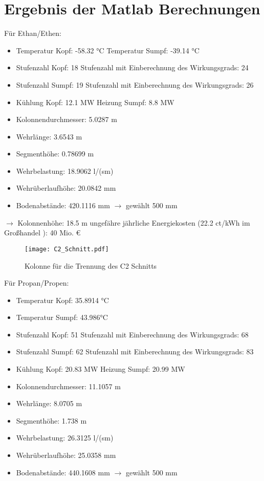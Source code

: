 \documentclass[12pt,a4paper,bibtotocnumbered,liststotocnumbered]{scrreprt}
\begin{document}
\section{Ergebnis der Matlab Berechnungen}
Für Ethan/Ethen:
\begin{itemize}
\item Temperatur Kopf: -58.32  °C  Temperatur Sumpf: -39.14 °C
\item Stufenzahl Kopf: 18 Stufenzahl mit Einberechnung des  Wirkungsgrads: 24
\item Stufenzahl Sumpf: 19 Stufenzahl mit Einberechnung des  Wirkungsgrads: 26
\item Kühlung Kopf: 12.1 MW  Heizung Sumpf: 8.8 MW
\item Kolonnendurchmesser: 5.0287 m
\item Wehrlänge: 3.6543 m
\item Segmenthöhe: 0.78699 m
\item Wehrbelastung: 18.9062 l/(sm)
\item Wehrüberlaufhöhe: 20.0842 mm
\item Bodenabstände: 420.1116 mm $\rightarrow$ gewählt 500 mm
\end{itemize}
 $\rightarrow$ Kolonnenhöhe: 18.5 m
ungefähre jährliche Energiekosten (22.2  ct/kWh im Großhandel \cite{Strompreis}):  40 Mio. €
 
\begin{figure}[H]
\begin{center}
\texttt{[image: C2\_Schnitt.pdf]}
\caption{Kolonne für die Trennung des C2 Schnitts}
\label{Abb: C2_Schnitt}
\end{center}
\end{figure}

\newpage
Für Propan/Propen:
\begin{itemize}
\item Temperatur Kopf: 35.8914 °C  
\item Temperatur Sumpf: 43.986°C
\item Stufenzahl Kopf: 51  Stufenzahl mit Einberechnung des  Wirkungsgrads: 68
\item Stufenzahl Sumpf: 62  Stufenzahl mit Einberechnung des  Wirkungsgrads: 83
\item Kühlung Kopf: 20.83 MW  Heizung Sumpf: 20.99 MW
\item Kolonnendurchmesser: 11.1057 m
\item Wehrlänge: 8.0705 m
\item Segmenthöhe: 1.738 m
\item Wehrbelastung: 26.3125 l/(sm)
\item Wehrüberlaufhöhe: 25.0358 mm
\item Bodenabstände: 440.1608 mm $\rightarrow$ gewählt 500 mm
\end{itemize}
\end{document}
